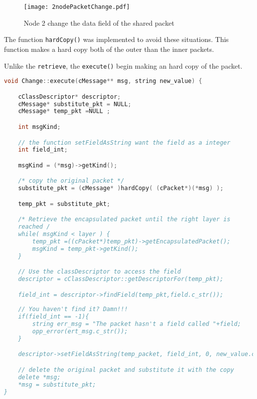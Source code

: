 \begin{figure}[h!]
\centering
\texttt{[image: 2nodePacketChange.pdf]}
\caption{Node 2 change the data field of the shared packet}
\label{fig: changeShared}
\end{figure} 
\fi
%
The function \texttt{hardCopy()} was implemented to avoid these situations. This function makes a hard copy both of the outer than the inner packets. 
%
\iffalse
Thus when we want to perform any method who change in some way a packet we perform an hard copy and then apply the changes.
Using the \texttt{hardCopy()} in our change action the nodes 2 and 3 have a different application packet, one modified and one not (Figure \ref{fig: changeSharedCopy}).
\fi
Unlike the \texttt{retrieve}, the \texttt{execute()} begin making an hard copy of the packet.
%
\begin{lstlisting}[language={cpp}]
void Change::execute(cMessage** msg, string new_value) {

	cClassDescriptor* descriptor; 
	cMessage* substitute_pkt = NULL; 
	cMessage* temp_pkt =NULL ;

	int msgKind;

	// the function setFieldAsString want the field as a integer
	int field_int; 

	msgKind = (*msg)->getKind();

	/* copy the original packet */
	substitute_pkt = (cMessage* )hardCopy( (cPacket*)(*msg) );

	temp_pkt = substitute_pkt;

	/* Retrieve the encapsulated packet until the right layer is
	reached /
	while( msgKind < layer ) {
		temp_pkt =((cPacket*)temp_pkt)->getEncapsulatedPacket();
		msgKind = temp_pkt->getKind();
	}

	// Use the classDescriptor to access the field
	descriptor = cClassDescriptor::getDescriptorFor(temp_pkt);

	field_int = descriptor->findField(temp_pkt,field.c_str());
	
	// You haven't find it? Damn!!!
	if(field_int == -1){
		string err_msg = "The packet hasn't a field called "+field;
		opp_error(ert_msg.c_str());
	}

	descriptor->setFieldAsString(temp_packet, field_int, 0, new_value.c_str());

	// delete the original packet and substitute it with the copy
	delete *msg;
	*msg = substitute_pkt;	
}
\end{lstlisting}

